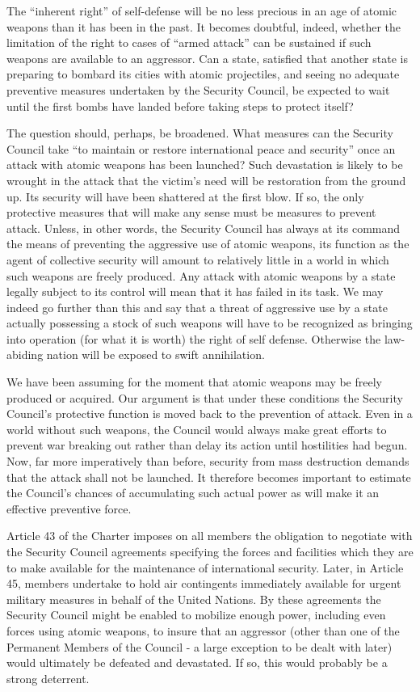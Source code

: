 The ``inherent right'' of self-defense will be no less precious in an age of atomic weapons than it has been in the past. It becomes doubtful, indeed, whether the limitation of the right to cases of ``armed attack'' can be sustained if such weapons are available to an aggressor. Can a state, satisfied that another state is preparing to bombard its cities with atomic projectiles, and seeing no adequate preventive measures undertaken by the Security Council, be expected to wait until the first bombs have landed before taking steps to protect itself?

The question should, perhaps, be broadened. What measures can the Security Council take ``to maintain or restore international peace and security'' once an attack with atomic weapons has been launched? Such devastation is likely to be wrought in the attack that the victim's need will be restoration from the ground up. Its security will have been shattered at the first blow. If so, the only protective measures that will make any sense must be measures to prevent attack. Unless, in other words, the Security Council has always at its command the means of preventing the aggressive use of atomic weapons, its function as the agent of collective security will amount to relatively little in a world in which such weapons are freely produced. Any attack with atomic weapons by a state legally subject to its control will mean that it has failed in its task. We may indeed go further than this and say that a threat of aggressive use by a state actually possessing a stock of such weapons will have to be recognized as bringing into operation (for what it is worth) the right of self defense. Otherwise the law-abiding nation will be exposed to swift annihilation.

We have been assuming for the moment that atomic weapons may be freely produced or acquired. Our argument is that under these conditions the Security Council's protective function is moved back to the prevention of attack. Even in a world without such weapons, the Council would always make great efforts to prevent war breaking out rather than delay its action until hostilities had begun. Now, far more imperatively than before, security from mass destruction demands that the attack shall not be launched. It therefore becomes important to estimate the Council's chances of accumulating such actual power as will make it an effective preventive force.

Article 43 of the Charter imposes on all members the obligation to negotiate with the Security Council agreements specifying the forces and facilities which they are to make available for the maintenance of international security. Later, in Article 45, members undertake to hold air contingents immediately available for urgent military measures in behalf of the United Nations. By these agreements the Security Council might be enabled to mobilize enough power, including even forces using atomic weapons, to insure that an aggressor (other than one of the Permanent Members of the Council - a large exception to be dealt with later) would ultimately be defeated and devastated. If so, this would probably be a strong deterrent.

